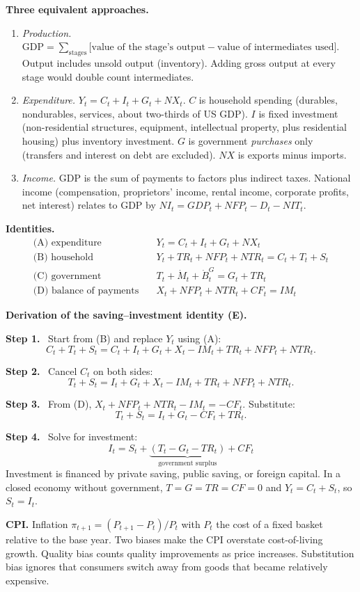 \documentclass[12pt]{article}
\newcommand{\st}[1]{\par\smallskip\textbf{Step #1.}\ }
\newcommand{\ans}[1]{\[\boxed{\ #1\ }\]}
\begin{document}
\textbf{Three equivalent approaches.}
\begin{enumerate}
\item \emph{Production.} $\text{GDP}=\sum_{\text{stages}}\big[\text{value of the stage's output}-\text{value of intermediates used}\big]$. Output includes unsold output (inventory). Adding gross output at every stage would double count intermediates.
\item \emph{Expenditure.} $Y_t=C_t+I_t+G_t+NX_t$. $C$ is household spending (durables, nondurables, services, about two-thirds of US GDP). $I$ is fixed investment (non-residential structures, equipment, intellectual property, plus residential housing) plus inventory investment. $G$ is government \emph{purchases} only (transfers and interest on debt are excluded). $NX$ is exports minus imports.
\item \emph{Income.} GDP is the sum of payments to factors plus indirect taxes. National income (compensation, proprietors' income, rental income, corporate profits, net interest) relates to GDP by $NI_t=GDP_t+NFP_t-D_t-NIT_t$.
\end{enumerate}

\textbf{Identities.}
\begin{align*}
\text{(A) expenditure}\quad & Y_t=C_t+I_t+G_t+NX_t\\
\text{(B) household}\quad & Y_t+TR_t+NFP_t+NTR_t=C_t+T_t+S_t\\
\text{(C) government}\quad & T_t+\dot M_t+\dot B^G_t=G_t+TR_t\\
\text{(D) balance of payments}\quad & X_t+NFP_t+NTR_t+CF_t=IM_t
\end{align*}

\textbf{Derivation of the saving--investment identity (E).}
\st{1} Start from (B) and replace $Y_t$ using (A):
\[
C_t+T_t+S_t=C_t+I_t+G_t+X_t-IM_t+TR_t+NFP_t+NTR_t .
\]
\st{2} Cancel $C_t$ on both sides:
\[
T_t+S_t=I_t+G_t+X_t-IM_t+TR_t+NFP_t+NTR_t .
\]
\st{3} From (D), $X_t+NFP_t+NTR_t-IM_t=-CF_t$. Substitute:
\[
T_t+S_t=I_t+G_t-CF_t+TR_t .
\]
\st{4} Solve for investment:
\ans{I_t=S_t+\underbrace{(T_t-G_t-TR_t)}_{\text{government surplus}}+CF_t}
Investment is financed by private saving, public saving, or foreign capital. In
a closed economy without government, $T=G=TR=CF=0$ and $Y_t=C_t+S_t$, so
$S_t=I_t$.

\textbf{CPI.} Inflation $\pi_{t+1}=(P_{t+1}-P_t)/P_t$ with $P_t$ the cost of a
fixed basket relative to the base year. Two biases make the CPI overstate
cost-of-living growth. Quality bias counts quality improvements as price
increases. Substitution bias ignores that consumers switch away from goods
that became relatively expensive.
\end{document}
